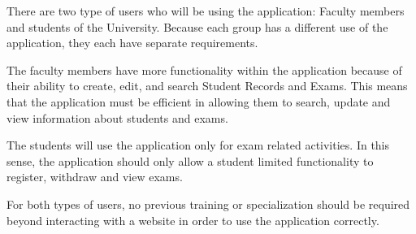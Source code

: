 
There are two type of users  who will be using the application: Faculty members
and students of the University. Because each group has a different use of the
application, they each have separate requirements. 

The faculty members have more functionality within the application because of
their ability to create, edit, and search Student Records and Exams. This means
that the application must be efficient in allowing them to search, update and
view information about students and exams.

The students will use the application only for exam related activities. In this
sense, the application should only allow a student limited functionality to
register, withdraw and view exams.

For both types of users, no previous training  or specialization should be
required beyond interacting with a website in order to use the application
correctly.
